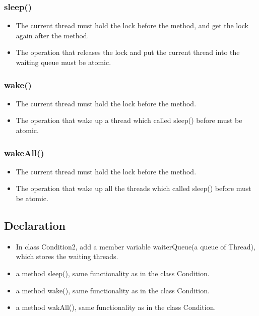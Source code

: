 \documentclass{article}
\begin{document}
	\subsubsection*{sleep()}
	\begin{itemize}
		\item The current thread must hold the lock before the method, and get the lock again after the method.
		
		\item The operation that releases the lock and put the current thread into the waiting queue  must be atomic.
	\end{itemize}
	
	\subsubsection*{wake()}
	\begin{itemize}
		\item The current thread must hold the lock before the method.
			
		\item The operation that wake up a thread which called sleep() before must be atomic.
	\end{itemize}
	
	\subsubsection*{wakeAll()}
	\begin{itemize}
		\item The current thread must hold the lock before the method.
		
		\item The operation that wake up all the threads which called sleep() before must be atomic.
	\end{itemize}
	
	\subsection{Declaration}
	
	\begin{itemize}
		\item In class Condition2, add a member variable waiterQueue(a queue of Thread), which stores the waiting threads.
		
		\item a method sleep(), same functionality as in the class Condition.
		
		\item a method wake(), same functionality as in the class Condition.
		
		\item a method wakAll(), same functionality as in the class Condition.
	\end{itemize}
	
\end{document}
